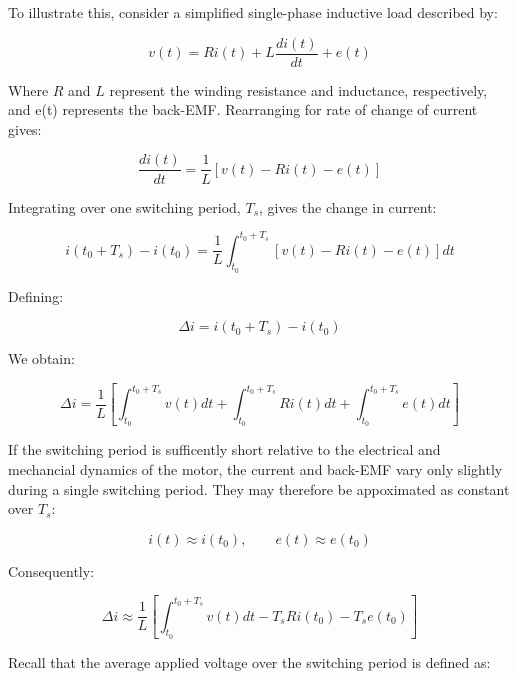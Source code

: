 \documentclass{article}
\begin{document}
To illustrate this, consider a simplified single-phase inductive load described by:

\begin{equation}
    v(t) = Ri(t) + L\frac{di(t)}{dt} + e(t)
\end{equation}

Where $R$ and $L$ represent the winding resistance and inductance, respectively, and e(t) represents the back-EMF. Rearranging for rate of change of current gives:

\begin{equation}
    \frac{di(t)}{dt} = \frac{1}{L}[v(t) - Ri(t) - e(t)]
\end{equation}

Integrating over one switching period, $T_s$, gives the change in current:

\begin{equation}
    i(t_0 + T_s) - i(t_0) = \frac{1}{L} \int_{t_0}^{t_0 + T_s} [v(t) - Ri(t) - e(t)] dt
\end{equation}

Defining:

\begin{equation}
    \Delta i = i(t_0 + T_s) - i(t_0)
\end{equation}

We obtain:

\begin{equation}
    \Delta i = \frac{1}{L} \left[ \int_{t_0}^{t_0 + T_s} v(t) dt + \int_{t_0}^{t_0 + T_s} Ri(t) dt + \int_{t_0}^{t_0 + T_s} e(t) dt \right]
\end{equation}

If the switching period is sufficently short relative to the electrical and mechancial dynamics of the motor, the current and back-EMF vary only slightly during a single switching period. They may therefore be appoximated as constant over $T_s$:

\begin{equation}
    i(t) \approx i(t_0), \qquad
    e(t) \approx e(t_0)
\end{equation}

Consequently:

\begin{equation}
    \Delta i \approx \frac{1}{L} \left[ \int_{t_0}^{t_0 + T_s} v(t) dt - T_sRi(t_0) - T_se(t_0) \right]
\end{equation}

Recall that the average applied voltage over the switching period is defined as:
\end{document}
